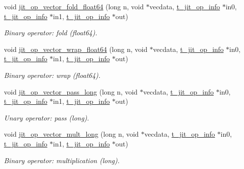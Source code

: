 \begin{DoxyCompactItemize}
void \hyperlink{group__opvecmod_gaea2e3cbdf2fb27800355ca7d7e916a08}{jit\_\-op\_\-vector\_\-fold\_\-float64} (long n, void $\ast$vecdata, \hyperlink{structt__jit__op__info}{t\_\-jit\_\-op\_\-info} $\ast$in0, \hyperlink{structt__jit__op__info}{t\_\-jit\_\-op\_\-info} $\ast$in1, \hyperlink{structt__jit__op__info}{t\_\-jit\_\-op\_\-info} $\ast$out)
\begin{DoxyCompactList}\small\item\em Binary operator: fold (float64). \item\end{DoxyCompactList}\item 
void \hyperlink{group__opvecmod_gae9bf2d11952a64e18e05b79224cb4041}{jit\_\-op\_\-vector\_\-wrap\_\-float64} (long n, void $\ast$vecdata, \hyperlink{structt__jit__op__info}{t\_\-jit\_\-op\_\-info} $\ast$in0, \hyperlink{structt__jit__op__info}{t\_\-jit\_\-op\_\-info} $\ast$in1, \hyperlink{structt__jit__op__info}{t\_\-jit\_\-op\_\-info} $\ast$out)
\begin{DoxyCompactList}\small\item\em Binary operator: wrap (float64). \item\end{DoxyCompactList}\item 
void \hyperlink{group__opvecmod_ga41ab0fc29cd955acb975666ebdc5b109}{jit\_\-op\_\-vector\_\-pass\_\-long} (long n, void $\ast$vecdata, \hyperlink{structt__jit__op__info}{t\_\-jit\_\-op\_\-info} $\ast$in0, \hyperlink{structt__jit__op__info}{t\_\-jit\_\-op\_\-info} $\ast$in1, \hyperlink{structt__jit__op__info}{t\_\-jit\_\-op\_\-info} $\ast$out)
\begin{DoxyCompactList}\small\item\em Unary operator: pass (long). \item\end{DoxyCompactList}\item 
void \hyperlink{group__opvecmod_gac48c6a346ad364916edfdcc5604b8279}{jit\_\-op\_\-vector\_\-mult\_\-long} (long n, void $\ast$vecdata, \hyperlink{structt__jit__op__info}{t\_\-jit\_\-op\_\-info} $\ast$in0, \hyperlink{structt__jit__op__info}{t\_\-jit\_\-op\_\-info} $\ast$in1, \hyperlink{structt__jit__op__info}{t\_\-jit\_\-op\_\-info} $\ast$out)
\begin{DoxyCompactList}\small\item\em Binary operator: multiplication (long). \item\end{DoxyCompactList}\item 

\end{DoxyCompactItemize}
